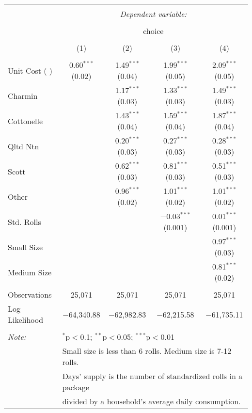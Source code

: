 
\begin{table}[!htbp] \centering 
  \caption{} 
  \label{tab:mnlPhiladelphiaBaseline} 
\begin{tabular}{@{\extracolsep{5pt}}lcccc} 
\\[-1.8ex]\hline 
\hline \\[-1.8ex] 
 & \multicolumn{4}{c}{\textit{Dependent variable:}} \\ 
\cline{2-5} 
\\[-1.8ex] & \multicolumn{4}{c}{choice} \\ 
\\[-1.8ex] & (1) & (2) & (3) & (4)\\ 
\hline \\[-1.8ex] 
 Unit Cost (-) & 0.60$^{***}$ (0.02) & 1.49$^{***}$ (0.04) & 1.99$^{***}$ (0.05) & 2.09$^{***}$ (0.05) \\ 
  Charmin &  & 1.17$^{***}$ (0.03) & 1.33$^{***}$ (0.03) & 1.49$^{***}$ (0.03) \\ 
  Cottonelle &  & 1.43$^{***}$ (0.04) & 1.59$^{***}$ (0.04) & 1.87$^{***}$ (0.04) \\ 
  Qltd Ntn &  & 0.20$^{***}$ (0.03) & 0.27$^{***}$ (0.03) & 0.28$^{***}$ (0.03) \\ 
  Scott &  & 0.62$^{***}$ (0.03) & 0.81$^{***}$ (0.03) & 0.51$^{***}$ (0.03) \\ 
  Other &  & 0.96$^{***}$ (0.02) & 1.01$^{***}$ (0.02) & 1.01$^{***}$ (0.02) \\ 
  Std. Rolls &  &  & $-$0.03$^{***}$ (0.001) & 0.01$^{***}$ (0.001) \\ 
  Small Size &  &  &  & 0.97$^{***}$ (0.03) \\ 
  Medium Size &  &  &  & 0.81$^{***}$ (0.02) \\ 
 \hline \\[-1.8ex] 
Observations & 25,071 & 25,071 & 25,071 & 25,071 \\ 
Log Likelihood & $-$64,340.88 & $-$62,982.83 & $-$62,215.58 & $-$61,735.11 \\ 
\hline 
\hline \\[-1.8ex] 
\textit{Note:}  & \multicolumn{4}{l}{$^{*}$p$<$0.1; $^{**}$p$<$0.05; $^{***}$p$<$0.01} \\ 
 & \multicolumn{4}{l}{Small size is less than 6 rolls. Medium size is 7-12 rolls. } \\ 
 & \multicolumn{4}{l}{Days' supply is the number of standardized rolls in a package} \\ 
 & \multicolumn{4}{l}{divided by a household's average daily consumption.} \\ 
\end{tabular} 
\end{table} 
